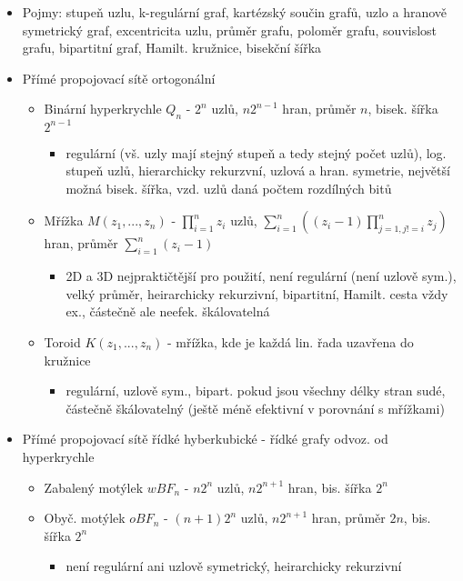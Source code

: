 \documentclass[a4paper,hidelinks]{article}
\begin{document}
\begin{itemize}
    \item Pojmy: stupeň uzlu, k-regulární graf, kartézský součin grafů, uzlo a hranově symetrický graf, excentricita uzlu, průměr grafu, poloměr grafu, souvislost grafu, bipartitní graf, Hamilt. kružnice, bisekční šířka
    \item Přímé propojovací sítě ortogonální
    \begin{itemize}
        \item Binární hyperkrychle $Q_n$ - $2^n$ uzlů, $n2^{n-1}$ hran, průměr $n$, bisek. šířka $2^{n-1}$
        \begin{itemize}
            \item regulární (vš. uzly mají stejný stupeň a tedy stejný počet uzlů), log. stupeň uzlů, hierarchicky rekurzvní, uzlová a hran. symetrie, největší možná bisek. šířka, vzd. uzlů daná počtem rozdílných bitů
        \end{itemize}
        \item Mřížka $M(z_1,...,z_n)$ - $\prod_{i=1}^{n}z_i$ uzlů, $\sum_{i=1}^{n}((z_i-1)\prod_{j=1,j!=i}^{n}z_j)$ hran, průměr $\sum_{i=1}^{n}(z_i-1)$
        \begin{itemize}
            \item 2D a 3D nejpraktičtější pro použití, není regulární (není uzlově sym.), velký průměr, heirarchicky rekurzivní, bipartitní, Hamilt. cesta vždy ex., částečně ale neefek. škálovatelná
        \end{itemize}
        \item Toroid $K(z_1,...,z_n)$ - mřížka, kde je každá lin. řada uzavřena do kružnice
        \begin{itemize}
            \item regulární, uzlově sym., bipart. pokud jsou všechny délky stran sudé, částečně škálovatelný (ještě méně efektivní v porovnání s mřížkami)
        \end{itemize}
    \end{itemize}
    \item Přímé propojovací sítě řídké hyberkubické - řídké grafy odvoz. od hyperkrychle
    \begin{itemize}
        \item Zabalený motýlek $wBF_n$ - $n2^n$ uzlů, $n2^{n+1}$ hran, bis. šířka $2^n$
        \item Obyč. motýlek $oBF_n$ - $(n+1)2^n$ uzlů, $n2^{n+1}$ hran, průměr $2n$, bis. šířka $2^n$
        \begin{itemize}
            \item není regulární ani uzlově symetrický, heirarchicky rekurzivní

\end{itemize}
\end{itemize}
\end{itemize}
\end{document}

